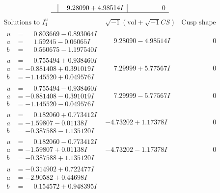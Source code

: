 \documentclass[1p]{elsarticle_modified}
\theoremstyle{definition}
\newcommand{\I}{\sqrt{-1}}
\begin{document}
$$\begin{array}{c|c|c}
 & \phantom{-}9.28090 + 4.98514 I & \phantom{-0.000000 } 0\\
 \hline 
 \end{array}$$\newpage$$\begin{array}{c|c|c}  
\text{Solutions to }I^u_{1}& \I (\text{vol} + \sqrt{-1}CS) & \text{Cusp shape}\\
 \hline 
\begin{aligned}
u &= \phantom{-}0.803669 - 0.893064 I \\
a &= \phantom{-}1.59245 - 0.06065 I \\
b &= \phantom{-}0.560675 - 1.197540 I\end{aligned}
 & \phantom{-}9.28090 - 4.98514 I & \phantom{-0.000000 } 0 \\ \hline\begin{aligned}
u &= \phantom{-}0.755494 + 0.938460 I \\
a &= -0.881408 + 0.391019 I \\
b &= -1.145520 + 0.049576 I\end{aligned}
 & \phantom{-}7.29999 + 5.77567 I & \phantom{-0.000000 } 0 \\ \hline\begin{aligned}
u &= \phantom{-}0.755494 - 0.938460 I \\
a &= -0.881408 - 0.391019 I \\
b &= -1.145520 - 0.049576 I\end{aligned}
 & \phantom{-}7.29999 - 5.77567 I & \phantom{-0.000000 } 0 \\ \hline\begin{aligned}
u &= \phantom{-}0.182060 + 0.773412 I \\
a &= -1.59807 - 0.01138 I \\
b &= -0.387588 - 1.135120 I\end{aligned}
 & -4.73202 + 1.17378 I & \phantom{-0.000000 } 0 \\ \hline\begin{aligned}
u &= \phantom{-}0.182060 - 0.773412 I \\
a &= -1.59807 + 0.01138 I \\
b &= -0.387588 + 1.135120 I\end{aligned}
 & -4.73202 - 1.17378 I & \phantom{-0.000000 } 0 \\ \hline\begin{aligned}
u &= -0.314902 + 0.722477 I \\
a &= -2.90582 + 0.44698 I \\
b &= \phantom{-}0.154572 + 0.948395 I\end{aligned}

\end{array}$$
\end{document}
